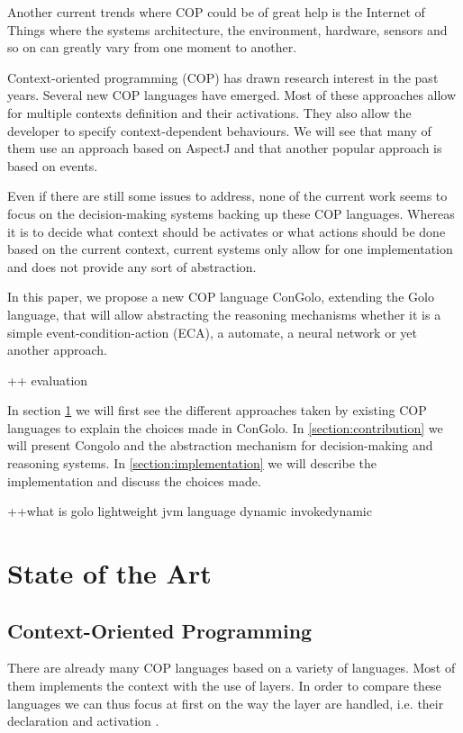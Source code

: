 \documentclass[a4paper]{article}
\begin{document}
Another current trends where COP could be of great help is the Internet of Things where the systems architecture, the environment, hardware, sensors and so on can greatly vary from one moment to another.

Context-oriented programming (COP) has drawn research interest in the past years. Several new COP languages have emerged. Most of these approaches allow for multiple contexts definition and their activations. They also allow the developer to specify context-dependent behaviours. We will see that many of them use an approach based on AspectJ and that another popular approach is based on events.

Even if there are still some issues to address, none of the current work seems to focus on the decision-making systems backing up these COP languages. Whereas it is to decide what context should be activates or what actions should be done based on the current context, current systems only allow for one implementation and does not provide any sort of abstraction.



In this paper, we propose a new COP language ConGolo, extending the Golo language, that will allow abstracting the reasoning mechanisms whether it is a simple event-condition-action (ECA), a automate, a neural network or yet another approach.

++ evaluation

In section \ref{section:stateoftheart} we will first see the different approaches taken by existing COP languages to explain the choices made in ConGolo. In \ref{section:contribution} we will present Congolo and the abstraction mechanism for decision-making and reasoning systems. In \ref{section:implementation} we will describe the implementation and discuss the choices made.


++what is golo \cite{ponge_golo_2013}
lightweight jvm language
dynamic
invokedynamic



\section{State of the Art}
\label{section:stateoftheart}

\subsection{Context-Oriented Programming}


There are already many COP languages based on a variety of languages. Most of them implements the context with the use of layers. In order to compare these languages we can thus focus at first on the way the layer are handled, i.e. their declaration and activation \cite{appeltauer_comparison_2009}.
\end{document}

